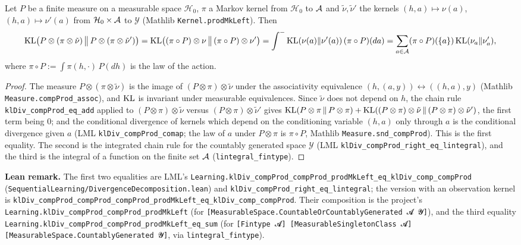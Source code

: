 \begin{lemma}\label{lem:pinfo_kl_step}
\leanok
Let $P$ be a finite measure on a measurable space $\mathcal H_0$, $\pi$ a Markov kernel from
$\mathcal H_0$ to $\mathcal{A}$ and $\tilde\nu, \tilde\nu'$ the kernels $(h, a) \mapsto \nu(a)$,
$(h, a) \mapsto \nu'(a)$ from $\mathcal H_0 \times \mathcal{A}$ to $\mathcal Y$ (Mathlib
\texttt{Kernel.prodMkLeft}). Then
\[
  \mathrm{KL}\big(P\otimes(\pi\otimes\tilde\nu)\,\big\|\,P\otimes(\pi\otimes\tilde\nu')\big)
  = \mathrm{KL}\big((\pi\circ P)\otimes\nu\,\big\|\,(\pi\circ P)\otimes\nu'\big)
  = \int^- \mathrm{KL}(\nu(a)\|\nu'(a))\,(\pi\circ P)(da)
  = \sum_{a\in\mathcal{A}} (\pi\circ P)(\{a\})\,\mathrm{KL}(\nu_a\|\nu'_a),
\]
where $\pi \circ P := \int \pi(h, \cdot)\,P(dh)$ is the law of the action.
\end{lemma}

\begin{proof}
\leanok
The measure $P \otimes (\pi \otimes \tilde\nu)$ is the image of $(P \otimes \pi) \otimes \tilde\nu$
under the associativity equivalence $(h, (a, y)) \leftrightarrow ((h, a), y)$ (Mathlib
\texttt{Measure.compProd\_assoc}), and $\mathrm{KL}$ is invariant under measurable equivalences. Since
$\tilde\nu$ does not depend on $h$, the chain rule \texttt{klDiv\_compProd\_eq\_add} applied to
$(P\otimes\pi)\otimes\tilde\nu$ versus $(P\otimes\pi)\otimes\tilde\nu'$ gives
$\mathrm{KL}(P\otimes\pi\,\|\,P\otimes\pi) + \mathrm{KL}((P\otimes\pi)\otimes\tilde\nu\,\|\,(P\otimes\pi)\otimes\tilde\nu') $,
the first term being $0$; and the conditional divergence of kernels which depend on the
conditioning variable $(h, a)$ only through $a$ is the conditional divergence given $a$
(LML \texttt{klDiv\_compProd\_comap}; the law of $a$ under $P\otimes\pi$ is
$\pi\circ P$, Mathlib \texttt{Measure.snd\_compProd}). This is the first equality. The second is
the integrated chain rule for the countably generated space $\mathcal Y$ (LML
\texttt{klDiv\_compProd\_right\_eq\_lintegral}), and the third is the integral of a function on
the finite set $\mathcal{A}$ (\texttt{lintegral\_fintype}).
\end{proof}

\textbf{Lean remark.} The first two equalities are LML's
\texttt{Learning.klDiv\_compProd\_compProd\_prodMkLeft\_eq\_klDiv\_comp\_compProd}
(\texttt{SequentialLearning/DivergenceDecomposition.lean}) and
\texttt{klDiv\_compProd\_right\_eq\_lintegral}; the version with an observation kernel is
\texttt{klDiv\_compProd\_compProd\_compProd\_prodMkLeft\_eq\_klDiv\_comp\_compProd}. Their
composition is the project's \texttt{Learning.klDiv\_compProd\_compProd\_prodMkLeft} (for
\texttt{[MeasurableSpace.CountableOrCountablyGenerated 𝓐 𝓨]}), and the third equality
\texttt{Learning.klDiv\_compProd\_compProd\_prodMkLeft\_eq\_sum} (for \texttt{[Fintype 𝓐]
[MeasurableSingletonClass 𝓐] [MeasurableSpace.CountablyGenerated 𝓨]}, via
\texttt{lintegral\_fintype}).

